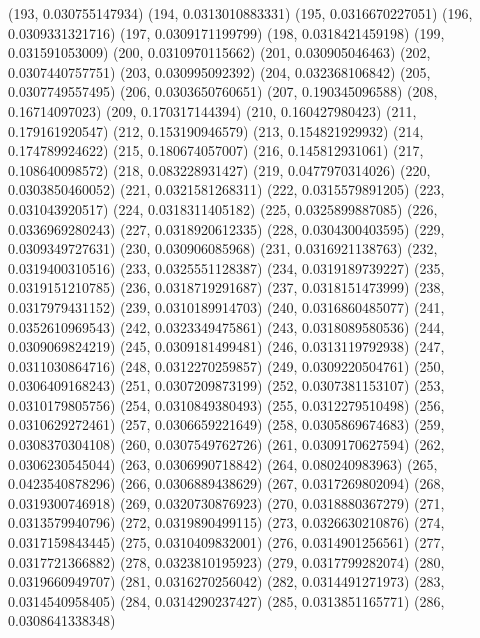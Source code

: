 {					(193, 0.030755147934)
					(194, 0.0313010883331)
					(195, 0.0316670227051)
					(196, 0.0309331321716)
					(197, 0.0309171199799)
					(198, 0.0318421459198)
					(199, 0.031591053009)
					(200, 0.0310970115662)
					(201, 0.030905046463)
					(202, 0.0307440757751)
					(203, 0.030995092392)
					(204, 0.032368106842)
					(205, 0.0307749557495)
					(206, 0.0303650760651)
					(207, 0.190345096588)
					(208, 0.16714097023)
					(209, 0.170317144394)
					(210, 0.160427980423)
					(211, 0.179161920547)
					(212, 0.153190946579)
					(213, 0.154821929932)
					(214, 0.174789924622)
					(215, 0.180674057007)
					(216, 0.145812931061)
					(217, 0.108640098572)
					(218, 0.083228931427)
					(219, 0.0477970314026)
					(220, 0.0303850460052)
					(221, 0.0321581268311)
					(222, 0.0315579891205)
					(223, 0.031043920517)
					(224, 0.0318311405182)
					(225, 0.0325899887085)
					(226, 0.0336969280243)
					(227, 0.0318920612335)
					(228, 0.0304300403595)
					(229, 0.0309349727631)
					(230, 0.030906085968)
					(231, 0.0316921138763)
					(232, 0.0319400310516)
					(233, 0.0325551128387)
					(234, 0.0319189739227)
					(235, 0.0319151210785)
					(236, 0.0318719291687)
					(237, 0.0318151473999)
					(238, 0.0317979431152)
					(239, 0.0310189914703)
					(240, 0.0316860485077)
					(241, 0.0352610969543)
					(242, 0.0323349475861)
					(243, 0.0318089580536)
					(244, 0.0309069824219)
					(245, 0.0309181499481)
					(246, 0.0313119792938)
					(247, 0.0311030864716)
					(248, 0.0312270259857)
					(249, 0.0309220504761)
					(250, 0.0306409168243)
					(251, 0.0307209873199)
					(252, 0.0307381153107)
					(253, 0.0310179805756)
					(254, 0.0310849380493)
					(255, 0.0312279510498)
					(256, 0.0310629272461)
					(257, 0.0306659221649)
					(258, 0.0305869674683)
					(259, 0.0308370304108)
					(260, 0.0307549762726)
					(261, 0.0309170627594)
					(262, 0.0306230545044)
					(263, 0.0306990718842)
					(264, 0.080240983963)
					(265, 0.0423540878296)
					(266, 0.0306889438629)
					(267, 0.0317269802094)
					(268, 0.0319300746918)
					(269, 0.0320730876923)
					(270, 0.0318880367279)
					(271, 0.0313579940796)
					(272, 0.0319890499115)
					(273, 0.0326630210876)
					(274, 0.0317159843445)
					(275, 0.0310409832001)
					(276, 0.0314901256561)
					(277, 0.0317721366882)
					(278, 0.0323810195923)
					(279, 0.0317799282074)
					(280, 0.0319660949707)
					(281, 0.0316270256042)
					(282, 0.0314491271973)
					(283, 0.0314540958405)
					(284, 0.0314290237427)
					(285, 0.0313851165771)
					(286, 0.0308641338348)
}
